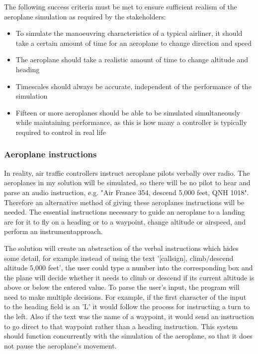 \documentclass{article}
\begin{document}
The following success criteria must be met to ensure sufficient realism of the aeroplane simulation as required by the stakeholders:
\begin{itemize}
    \item To simulate the manoeuvring characteristics of a typical airliner, it should take a certain amount of time for an aeroplane to change direction and speed
    \item The aeroplane should take a realistic amount of time to change altitude and heading
    \item Timescales should always be accurate, independent of the performance of the simulation
    \item Fifteen or more aeroplanes should be able to be simulated simultaneously while maintaining performance, as this is how many a controller is typically required to control in real life
\end{itemize}

\subsubsection{Aeroplane instructions}
In reality, air traffic controllers instruct aeroplane pilots verbally over radio.
The aeroplanes in my solution will be simulated, so there will be no pilot to hear and parse an audio instruction, e.g. "Air France 354, descend 5,000 feet, QNH 1018".
Therefore an alternative method of giving these aeroplanes instructions will be needed.
The essential instructions necessary to guide an aeroplane to a landing are for it to fly on a \gls{heading} or to a \gls{waypoint}, change altitude or \gls{airspeed}, and perform an \gls{instrumentapproach}.

The solution will create an abstraction of the verbal instructions which hides some detail, for example instead of using the text '[callsign], climb/descend altitude 5,000 feet', the user could type a number into the corresponding box and the plane will decide whether it needs to climb or descend if its current altitude is above or below the entered value.
To parse the user's input, the program will need to make multiple decisions.
For example, if the first character of the input to the heading field is an 'L' it would follow the process for instructing a turn to the left.
Also if the text was the name of a waypoint, it would send an instruction to go direct to that waypoint rather than a heading instruction.
This system should function concurrently with the simulation of the aeroplane, so that it does not pause the aeroplane's movement.
\end{document}
